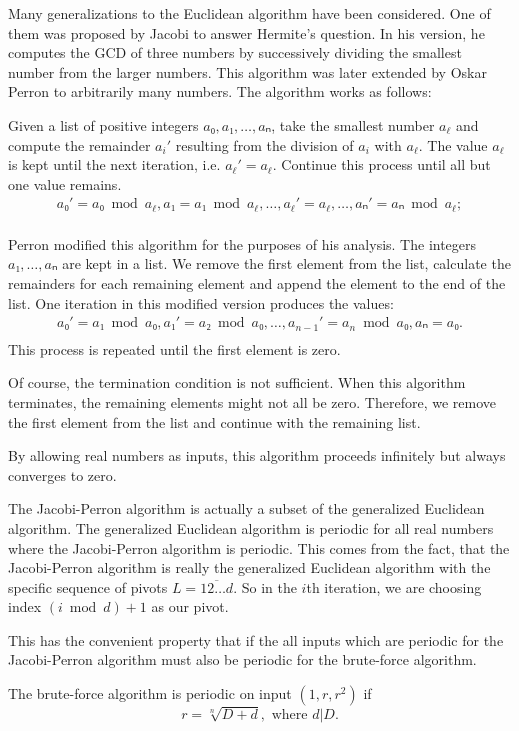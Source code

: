 Many generalizations to the Euclidean algorithm have been considered.
One of them was proposed by Jacobi to answer Hermite's question.
In his version, he computes the GCD of three numbers by successively dividing
the smallest number from the larger numbers.
This algorithm was later extended by Oskar Perron to arbitrarily many numbers.
The algorithm works as follows:

Given a list of positive integers $a₀, a₁, …, aₙ$, take the smallest number $a_ℓ$
and compute the remainder $a_i'$ resulting from the division of $a_i$ with $a_ℓ$.
The value $a_ℓ$ is kept until the next iteration, i.e. $a_ℓ' = a_ℓ$.
Continue this process until all but one value remains.
\begin{align*}
  a₀' = a₀ \bmod a_ℓ, a₁ = a₁ \bmod a_ℓ, …, a_ℓ' = a_ℓ, …, aₙ' = aₙ \bmod a_ℓ; \\
\end{align*}

Perron modified this algorithm for the purposes of his analysis.
The integers $a₁, …, aₙ$ are kept in a list.
We remove the first element from the list, calculate the remainders for each
remaining element and append the element to the end of the list.
One iteration in this modified version produces the values:
\begin{align*}
  a₀' = a₁ \bmod a₀, a₁' = a₂ \bmod a₀, …, a_{n-1}' = a_n \bmod a₀, aₙ = a₀. \\
\end{align*}
This process is repeated until the first element is zero.

Of course, the termination condition is not sufficient.
When this algorithm terminates, the remaining elements might not all be zero.
Therefore, we remove the first element from the list and continue with the
remaining list.

By allowing real numbers as inputs, this algorithm proceeds infinitely but
always converges to zero.

The Jacobi-Perron algorithm is actually a subset of the generalized Euclidean algorithm.
The generalized Euclidean algorithm is periodic for all real numbers where the Jacobi-Perron algorithm is periodic.
This comes from the fact, that the Jacobi-Perron algorithm is really the
generalized Euclidean algorithm with the specific sequence of pivots $L = \overline{12…d}$.
So in the $i$th iteration, we are choosing index $(i \bmod d) + 1$ as our pivot.

This has the convenient property that if the all inputs which are periodic for
the Jacobi-Perron algorithm must also be periodic for the brute-force algorithm.

\begin{theorem}
  The brute-force algorithm is periodic on input $(1, r, r^2)$ if
  \[
    r = \sqrt[n]{D + d}, \text{ where } d | D.
  \]
\end{theorem}

